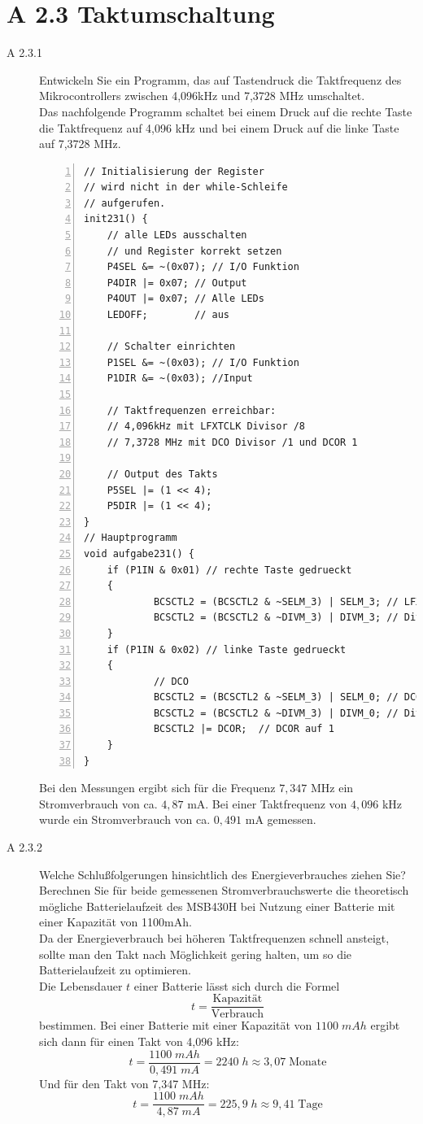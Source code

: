 \documentclass[11pt,a4paper,ngerman]{article}
\begin{document}
\pagebreak
\section*{A 2.3 Taktumschaltung}
\begin{description}
\item[A 2.3.1] Entwickeln Sie ein Programm, das auf Tastendruck die Taktfrequenz des Mikrocontrollers zwischen 4,096kHz und 7,3728 MHz umschaltet. \\

Das nachfolgende Programm schaltet bei einem Druck auf die rechte Taste die Taktfrequenz auf 4,096 kHz und bei einem Druck auf die linke Taste auf 7,3728 MHz.
\begin{lstlisting}[numbers=left]
// Initialisierung der Register
// wird nicht in der while-Schleife
// aufgerufen.
init231() {
	// alle LEDs ausschalten
	// und Register korrekt setzen
	P4SEL &= ~(0x07); // I/O Funktion
	P4DIR |= 0x07; // Output
	P4OUT |= 0x07; // Alle LEDs
	LEDOFF;		   // aus

	// Schalter einrichten
	P1SEL &= ~(0x03); // I/O Funktion
	P1DIR &= ~(0x03); //Input

	// Taktfrequenzen erreichbar:
	// 4,096kHz mit LFXTCLK Divisor /8
	// 7,3728 MHz mit DCO Divisor /1 und DCOR 1

	// Output des Takts
	P5SEL |= (1 << 4);
	P5DIR |= (1 << 4);
}	
// Hauptprogramm
void aufgabe231() {
	if (P1IN & 0x01) // rechte Taste gedrueckt
	{
			BCSCTL2 = (BCSCTL2 & ~SELM_3) | SELM_3; // LFXTCLK
			BCSCTL2 = (BCSCTL2 & ~DIVM_3) | DIVM_3; // Divisor 8
	}
	if (P1IN & 0x02) // linke Taste gedrueckt
	{
			// DCO
			BCSCTL2 = (BCSCTL2 & ~SELM_3) | SELM_0; // DCO
			BCSCTL2 = (BCSCTL2 & ~DIVM_3) | DIVM_0; // Divisor 1
			BCSCTL2 |= DCOR;  // DCOR auf 1
	}
}
\end{lstlisting}

Bei den Messungen ergibt sich für die Frequenz $7,347$ MHz ein Stromverbrauch von ca. $4,87$ mA. Bei einer Taktfrequenz von $4,096$ kHz wurde ein Stromverbrauch von ca. $0,491$ mA gemessen.

\item[A 2.3.2] Welche Schlußfolgerungen hinsichtlich des Energieverbrauches ziehen Sie? Berechnen Sie für beide gemessenen Stromverbrauchswerte die theoretisch mögliche Batterielaufzeit des MSB430H bei Nutzung einer Batterie mit einer Kapazität von 1100mAh. \\

Da der Energieverbrauch bei höheren Taktfrequenzen schnell ansteigt, sollte man den Takt nach Möglichkeit gering halten, um so die Batterielaufzeit zu optimieren.\\
Die Lebensdauer $t$ einer Batterie lässt sich durch die Formel 
$$ t = \frac{\text{Kapazität}}{\text{Verbrauch}} $$
bestimmen. 
\newpage
Bei einer Batterie mit einer Kapazität von $1100 \; mAh$ ergibt sich dann für einen Takt von 4,096 kHz:
$$ t = \frac{1100 \; mAh}{0,491 \; mA} = 2240 \; h \approx 3,07 \; \text{Monate}$$
Und für den Takt von 7,347 MHz:
$$ t = \frac{1100 \; mAh}{4,87 \; mA} = 225,9 \; h \approx 9,41 \; \text{Tage} $$


\end{description}
\end{document}
